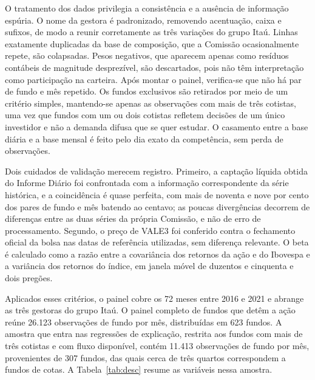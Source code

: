 \documentclass[12pt,a4paper]{article}
\begin{document}
O tratamento dos dados privilegia a consistência e a ausência de informação espúria. O nome
da gestora é padronizado, removendo acentuação, caixa e sufixos, de modo a reunir
corretamente as três variações do grupo Itaú. Linhas exatamente duplicadas da base de
composição, que a Comissão ocasionalmente repete, são colapsadas. Pesos negativos, que
aparecem apenas como resíduos contábeis de magnitude desprezível, são descartados, pois não
têm interpretação como participação na carteira. Após montar o painel, verifica-se que não
há par de fundo e mês repetido. Os fundos exclusivos são retirados por meio de um critério
simples, mantendo-se apenas as observações com mais de três cotistas, uma vez que fundos com
um ou dois cotistas refletem decisões de um único investidor e não a demanda difusa que se
quer estudar. O casamento entre a base diária e a base mensal é feito pelo dia exato da
competência, sem perda de observações.

Dois cuidados de validação merecem registro. Primeiro, a captação líquida obtida do Informe
Diário foi confrontada com a informação correspondente da série histórica, e a coincidência
é quase perfeita, com mais de noventa e nove por cento dos pares de fundo e mês batendo ao
centavo; as poucas divergências decorrem de diferenças entre as duas séries da própria
Comissão, e não de erro de processamento. Segundo, o preço de VALE3 foi conferido contra o
fechamento oficial da bolsa nas datas de referência utilizadas, sem diferença relevante. O
beta é calculado como a razão entre a covariância dos retornos da ação e do Ibovespa e a
variância dos retornos do índice, em janela móvel de duzentos e cinquenta e dois pregões.

Aplicados esses critérios, o painel cobre os 72 meses entre 2016 e 2021 e abrange as três
gestoras do grupo Itaú. O painel completo de fundos que detêm a ação reúne 26.123 observações
de fundo por mês, distribuídas em 623 fundos. A amostra que entra nas regressões de
explicação, restrita aos fundos com mais de três cotistas e com fluxo disponível, contém
11.413 observações de fundo por mês, provenientes de 307 fundos, das quais cerca de três
quartos correspondem a fundos de cotas. A Tabela~\ref{tab:desc} resume as variáveis nessa
amostra.
\end{document}
